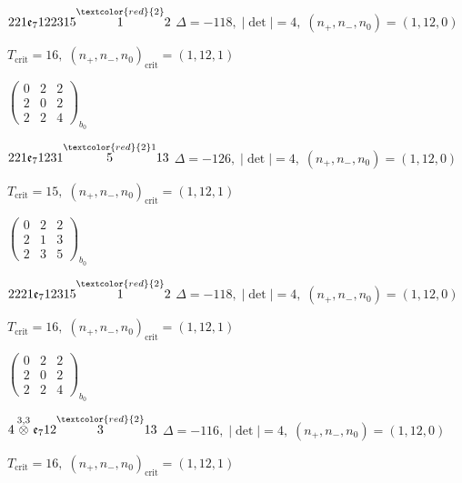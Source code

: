 \documentclass[10pt]{article}
\begin{document}
$221\mathfrak{e}_7122315\overset{\textcolor{red}{2}}{1}2$ \quad $\Delta=-118,\; |\det|=4,\; (n_+,n_-,n_0)=(1,12,0)$

\hspace{1em}$T_{\text{crit}}=16,\; (n_+,n_-,n_0)_{\text{crit}}=(1,12,1)$

\hspace{2em}$\left(\begin{smallmatrix}0 & 2 & 2 \\ 2 & 0 & 2 \\ 2 & 2 & 4\end{smallmatrix}\right)_{\!b_0}$

\smallskip

$221\mathfrak{e}_71231\overset{\textcolor{red}{2}1}{5}13$ \quad $\Delta=-126,\; |\det|=4,\; (n_+,n_-,n_0)=(1,12,0)$

\hspace{1em}$T_{\text{crit}}=15,\; (n_+,n_-,n_0)_{\text{crit}}=(1,12,1)$

\hspace{2em}$\left(\begin{smallmatrix}0 & 2 & 2 \\ 2 & 1 & 3 \\ 2 & 3 & 5\end{smallmatrix}\right)_{\!b_0}$

\smallskip

$2221\mathfrak{e}_712315\overset{\textcolor{red}{2}}{1}2$ \quad $\Delta=-118,\; |\det|=4,\; (n_+,n_-,n_0)=(1,12,0)$

\hspace{1em}$T_{\text{crit}}=16,\; (n_+,n_-,n_0)_{\text{crit}}=(1,12,1)$

\hspace{2em}$\left(\begin{smallmatrix}0 & 2 & 2 \\ 2 & 0 & 2 \\ 2 & 2 & 4\end{smallmatrix}\right)_{\!b_0}$

\smallskip

$4\overset{3,3}{\otimes}\mathfrak{e}_712\overset{\textcolor{red}{2}}{3}13$ \quad $\Delta=-116,\; |\det|=4,\; (n_+,n_-,n_0)=(1,12,0)$

\hspace{1em}$T_{\text{crit}}=16,\; (n_+,n_-,n_0)_{\text{crit}}=(1,12,1)$
\end{document}
